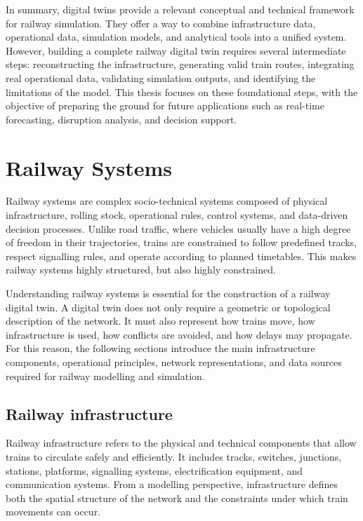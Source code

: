 \newpage

In summary, digital twins provide a relevant conceptual and technical framework for railway simulation. They offer a way 
to combine infrastructure data, operational data, simulation models, and analytical tools into a unified system. However, 
building a complete railway digital twin requires several intermediate steps: reconstructing the infrastructure, 
generating valid train routes, integrating real operational data, validating simulation outputs, and identifying the 
limitations of the model. This thesis focuses on these foundational steps, with the objective of preparing the ground for 
future applications such as real-time forecasting, disruption analysis, and decision support.

\section{Railway Systems}
Railway systems are complex socio-technical systems composed of physical infrastructure, rolling stock, operational rules, 
control systems, and data-driven decision processes. Unlike road traffic, where vehicles usually have a high degree of 
freedom in their trajectories, trains are constrained to follow predefined tracks, respect signalling rules, and operate 
according to planned timetables. This makes railway systems highly structured, but also highly constrained.

Understanding railway systems is essential for the construction of a railway digital twin. A digital twin does not only 
require a geometric or topological description of the network. It must also represent how trains move, how infrastructure 
is used, how conflicts are avoided, and how delays may propagate. For this reason, the following sections introduce the 
main infrastructure components, operational principles, network representations, and data sources required for railway 
modelling and simulation.

\subsection{Railway infrastructure}
Railway infrastructure refers to the physical and technical components that allow trains to circulate safely and 
efficiently. It includes tracks, switches, junctions, stations, platforms, signalling systems, electrification equipment, 
and communication systems. From a modelling perspective, infrastructure defines both the spatial structure of the network 
and the constraints under which train movements can occur.

